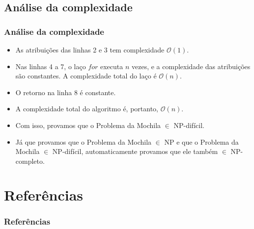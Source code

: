 \documentclass{beamer}
\begin{document}
\subsection{Análise da complexidade}
\begin{frame}
\frametitle{Análise da complexidade}
    \begin{itemize}
        \item As atribuições das linhas 2 e 3 tem complexidade $\mathcal{O}(1)$.

        \item Nas linhas 4 a 7, o laço $for$ executa $n$ vezes, e a complexidade das atribuições são constantes.
            A complexidade total do laço é $\mathcal{O}(n)$.
        \item O retorno na linha 8 é constante.
        \item A complexidade total do algoritmo é, portanto, $\mathcal{O}(n)$.
        \item Com isso, provamos que o Problema da Mochila $\in$ NP-difícil.
        
        \item Já que provamos que o Problema da Mochila $\in$ NP e que o Problema da Mochila $\in$ NP-difícil, automaticamente provamos que ele também $\in$ NP-completo.
    \end{itemize}
\end{frame}

\section{Referências}
\begin{frame}
\frametitle{Referências}
\end{frame}
\end{document}
